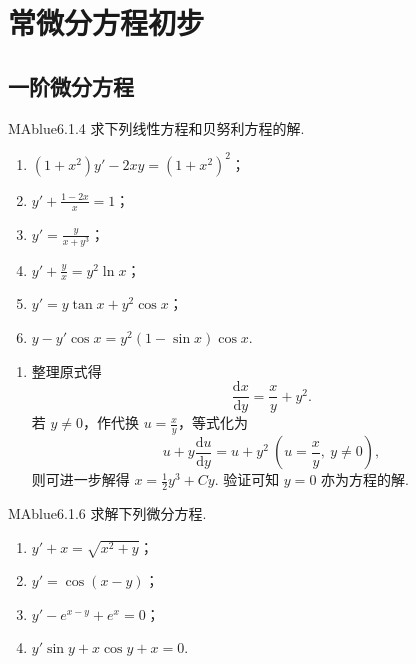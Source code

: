 \chapter{常微分方程初步}

\section{一阶微分方程}

\begin{problem}{MAblue}{6.1.4}
    求下列线性方程和贝努利方程的解.
    \begin{multicols}{2}
        \begin{enumerate}
            \item[(1)]
            $(1+x^2)y' - 2xy = (1+x^2)^2$；
            \item[(2)]
            $y' + \frac {1-2x} x = 1$；
            \item[(3)]
            $y' = \frac y {x+y^3}$；
            \item[(4)]
            $y' + \frac y x = y^2 \ln x$；
            \item[(5)]
            $y' = y\tan x + y^2\cos x$；
            \item[(6)]
            $y - y'\cos x = y^2(1-\sin x)\cos x$.
        \end{enumerate}
    \end{multicols}
\end{problem}

\begin{enumerate}
    \item[(3)]
    \begin{solution}
        整理原式得
        \[
            \frac{\mathrm dx}{\mathrm dy} = \frac x y + y^2.
        \]
        若 $y \neq 0$，作代换 $u = \frac x y$，等式化为
        \[
            u + y \frac{\mathrm du}{\mathrm dy} = u + y^2 \ \left( u = \frac x y,\ y \neq 0 \right),
        \]
        则可进一步解得 $x = \frac 1 2 y^3 + Cy$. 验证可知 $y = 0$ 亦为方程的解.
    \end{solution}
\end{enumerate}

\begin{problem}{MAblue}{6.1.6}
    求解下列微分方程.
    \begin{multicols}{2}
        \begin{enumerate}
            \item[(1)]
            $y' + x = \sqrt{x^2 + y}$；
            \item[(2)]
            $y' = \cos(x-y)$；
            \item[(3)]
            $y' - e^{x-y} + e^x = 0$；
            \item[(4)]
            $y'\sin y + x\cos y + x = 0$.
        \end{enumerate}
    \end{multicols}
\end{problem}

